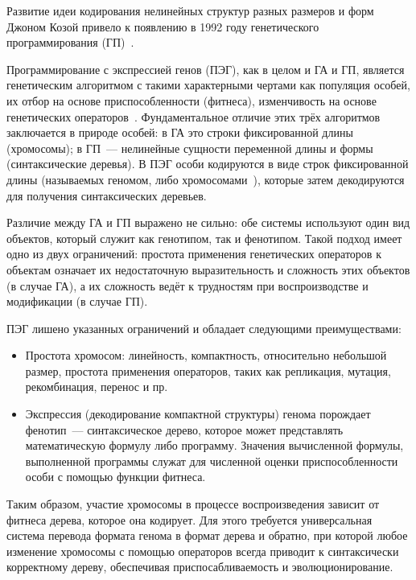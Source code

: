Развитие идеи кодирования нелинейных структур разных размеров и форм Джоном Козой привело к появлению в 1992 году генетического программирования (ГП)~\cite{Koza92}.

Программирование с экспрессией генов (ПЭГ), как в целом и ГА и ГП, является генетическим алгоритмом с такими характерными чертами как популяция особей, их отбор на основе приспособленности (фитнеса), изменчивость на основе генетических операторов~\cite{Ferreira2001}. Фундаментальное отличие этих трёх алгоритмов заключается в природе особей: в ГА это строки фиксированной длины (хромосомы); в ГП~--- нелинейные сущности переменной длины и формы (синтаксические деревья). В ПЭГ особи кодируются в виде строк фиксированной длины (называемых геномом, либо хромосомами~\cite{ferreira:2001:wsc6Aa}), которые затем декодируются для получения синтаксических деревьев.

Различие между ГА и ГП выражено не сильно: обе системы используют один вид объектов, который служит как генотипом, так и фенотипом. Такой подход имеет одно из двух ограничений: простота применения генетических операторов к объектам означает их недостаточную выразительность и сложность этих объектов (в случае ГА), а их сложность ведёт к трудностям при воспроизводстве и модификации (в случае ГП).

ПЭГ лишено указанных ограничений и обладает следующими преимуществами:
\begin{itemize}
  \item Простота хромосом: линейность, компактность, относительно небольшой размер, простота применения операторов, таких как репликация, мутация, рекомбинация, перенос и пр.
  \item Экспрессия (декодирование компактной структуры) генома порождает фенотип~--- синтаксическое дерево, которое может представлять математическую формулу либо программу. Значения вычисленной формулы, выполненной программы служат для численной оценки приспособленности особи с помощью функции фитнеса.
\end{itemize}

Таким образом, участие хромосомы в процессе воспроизведения зависит от фитнеса дерева, которое она кодирует. Для этого требуется универсальная система перевода формата генома в формат дерева и обратно, при которой любое изменение хромосомы с помощью операторов всегда приводит к синтаксически корректному дереву, обеспечивая приспосабливаемость и эволюционирование.







